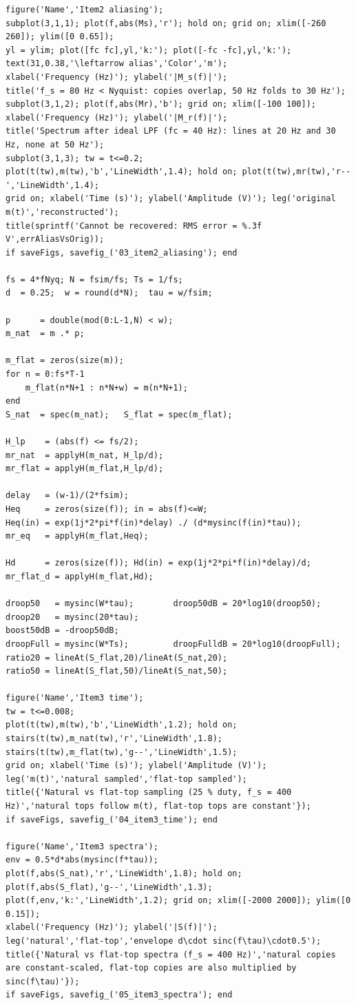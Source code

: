 \documentclass[a4paper]{article}
\begin{document}
\begin{lstlisting}[basicstyle=\ttfamily\scriptsize, breaklines=true, breakatwhitespace=true, frame=single, xleftmargin=6pt, xrightmargin=6pt, framexleftmargin=6pt, framexrightmargin=6pt, aboveskip=4pt, belowskip=6pt]
figure('Name','Item2 aliasing');
subplot(3,1,1); plot(f,abs(Ms),'r'); hold on; grid on; xlim([-260 260]); ylim([0 0.65]);
yl = ylim; plot([fc fc],yl,'k:'); plot([-fc -fc],yl,'k:');
text(31,0.38,'\leftarrow alias','Color','m');
xlabel('Frequency (Hz)'); ylabel('|M_s(f)|');
title('f_s = 80 Hz < Nyquist: copies overlap, 50 Hz folds to 30 Hz');
subplot(3,1,2); plot(f,abs(Mr),'b'); grid on; xlim([-100 100]);
xlabel('Frequency (Hz)'); ylabel('|M_r(f)|');
title('Spectrum after ideal LPF (fc = 40 Hz): lines at 20 Hz and 30 Hz, none at 50 Hz');
subplot(3,1,3); tw = t<=0.2;
plot(t(tw),m(tw),'b','LineWidth',1.4); hold on; plot(t(tw),mr(tw),'r--','LineWidth',1.4);
grid on; xlabel('Time (s)'); ylabel('Amplitude (V)'); leg('original m(t)','reconstructed');
title(sprintf('Cannot be recovered: RMS error = %.3f V',errAliasVsOrig));
if saveFigs, savefig_('03_item2_aliasing'); end

fs = 4*fNyq; N = fsim/fs; Ts = 1/fs;
d  = 0.25;  w = round(d*N);  tau = w/fsim;

p      = double(mod(0:L-1,N) < w);
m_nat  = m .* p;

m_flat = zeros(size(m));
for n = 0:fs*T-1
    m_flat(n*N+1 : n*N+w) = m(n*N+1);
end
S_nat  = spec(m_nat);   S_flat = spec(m_flat);

H_lp    = (abs(f) <= fs/2);
mr_nat  = applyH(m_nat, H_lp/d);
mr_flat = applyH(m_flat,H_lp/d);

delay   = (w-1)/(2*fsim);
Heq     = zeros(size(f)); in = abs(f)<=W;
Heq(in) = exp(1j*2*pi*f(in)*delay) ./ (d*mysinc(f(in)*tau));
mr_eq   = applyH(m_flat,Heq);

Hd      = zeros(size(f)); Hd(in) = exp(1j*2*pi*f(in)*delay)/d;
mr_flat_d = applyH(m_flat,Hd);

droop50   = mysinc(W*tau);        droop50dB = 20*log10(droop50);
droop20   = mysinc(20*tau);
boost50dB = -droop50dB;
droopFull = mysinc(W*Ts);         droopFulldB = 20*log10(droopFull);
ratio20 = lineAt(S_flat,20)/lineAt(S_nat,20);
ratio50 = lineAt(S_flat,50)/lineAt(S_nat,50);

figure('Name','Item3 time');
tw = t<=0.008;
plot(t(tw),m(tw),'b','LineWidth',1.2); hold on;
stairs(t(tw),m_nat(tw),'r','LineWidth',1.8);
stairs(t(tw),m_flat(tw),'g--','LineWidth',1.5);
grid on; xlabel('Time (s)'); ylabel('Amplitude (V)');
leg('m(t)','natural sampled','flat-top sampled');
title({'Natural vs flat-top sampling (25 % duty, f_s = 400 Hz)','natural tops follow m(t), flat-top tops are constant'});
if saveFigs, savefig_('04_item3_time'); end

figure('Name','Item3 spectra');
env = 0.5*d*abs(mysinc(f*tau));
plot(f,abs(S_nat),'r','LineWidth',1.8); hold on;
plot(f,abs(S_flat),'g--','LineWidth',1.3);
plot(f,env,'k:','LineWidth',1.2); grid on; xlim([-2000 2000]); ylim([0 0.15]);
xlabel('Frequency (Hz)'); ylabel('|S(f)|');
leg('natural','flat-top','envelope d\cdot sinc(f\tau)\cdot0.5');
title({'Natural vs flat-top spectra (f_s = 400 Hz)','natural copies are constant-scaled, flat-top copies are also multiplied by sinc(f\tau)'});
if saveFigs, savefig_('05_item3_spectra'); end


\end{lstlisting}
\end{document}
